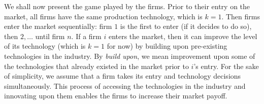 \documentclass{article}
\begin{document}
\indent We shall now present the game played by the firms. Prior to their entry on the market, all firms have the same production technology, which is $k=1$. Then firms enter the market sequentially: firm $1$ is the first to enter (if it decides to do so), then $2,\ldots$ until firm $n$. If a firm $i$ enters the market, then it can improve the level of its technology (which is $k=1$ for now) by building upon pre-existing technologies in the industry. By \textit{build upon}, we mean improvement upon some of the technologies that already existed in the market prior to $i$'s entry. For the sake of simplicity, we assume that a firm takes its entry and technology decisions simultaneously. This process of accessing the technologies in the industry and innovating upon them enables the firms to increase their market payoff. \\
\end{document}
